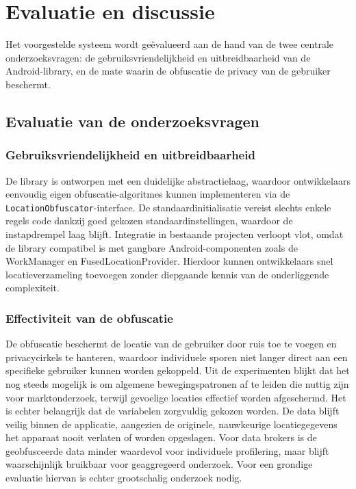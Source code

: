 \chapter{Evaluatie en discussie} \label{chap:evaluatie}
Het voorgestelde systeem wordt geëvalueerd aan de hand van de twee centrale onderzoeksvragen: de gebruiksvriendelijkheid en uitbreidbaarheid van de Android-library, en de mate waarin de obfuscatie de privacy van de gebruiker beschermt.

\section{Evaluatie van de onderzoeksvragen}
\subsection{Gebruiksvriendelijkheid en uitbreidbaarheid}
De library is ontworpen met een duidelijke abstractielaag, waardoor ontwikkelaars eenvoudig eigen obfuscatie-algoritmes kunnen implementeren via de \texttt{LocationObfuscator}-interface. De standaardinitialisatie vereist slechts enkele regels code dankzij goed gekozen standaardinstellingen, waardoor de instapdrempel laag blijft. Integratie in bestaande projecten verloopt vlot, omdat de library compatibel is met gangbare Android-componenten zoals de WorkManager en FusedLocationProvider. Hierdoor kunnen ontwikkelaars snel locatieverzameling toevoegen zonder diepgaande kennis van de onderliggende complexiteit.

\subsection{Effectiviteit van de obfuscatie}
De obfuscatie beschermt de locatie van de gebruiker door ruis toe te voegen en privacycirkels te hanteren, waardoor individuele sporen niet langer direct aan een specifieke gebruiker kunnen worden gekoppeld. Uit de experimenten blijkt dat het nog steeds mogelijk is om algemene bewegingspatronen af te leiden die nuttig zijn voor marktonderzoek, terwijl gevoelige locaties effectief worden afgeschermd. Het is echter belangrijk dat de variabelen zorgvuldig gekozen worden. De data blijft veilig binnen de applicatie, aangezien de originele, nauwkeurige locatiegegevens het apparaat nooit verlaten of worden opgeslagen. Voor data brokers is de geobfusceerde data minder waardevol voor individuele profilering, maar blijft waarschijnlijk bruikbaar voor geaggregeerd onderzoek. Voor een grondige evaluatie hiervan is echter grootschalig onderzoek nodig.

